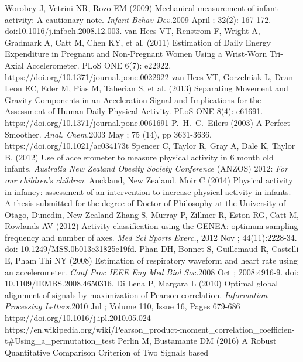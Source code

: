 \documentclass{article}
\begin{document}
\begin{thebibliography}{99} 

Worobey J, Vetrini NR, Rozo EM (2009) Mechanical measurement of infant activity: A cautionary note.
\textit{Infant Behav Dev.}2009 April ; 32(2): 167-172. doi:10.1016/j.infbeh.2008.12.003.
van Hees VT, Renstrom F, Wright A, Gradmark A, Catt M, Chen KY, et al. (2011) Estimation of Daily Energy Expenditure in Pregnant and Non-Pregnant Women Using a Wrist-Worn Tri-Axial Accelerometer. 
PLoS ONE 6(7): e22922. https://doi.org/10.1371/journal.pone.0022922
van Hees VT, Gorzelniak L, Dean Leon EC, Eder M, Pias M, Taherian S, et al. (2013) Separating Movement and Gravity Components in an Acceleration Signal and Implications for the Assessment of Human Daily Physical Activity. PLoS ONE 8(4): e61691. https://doi.org/10.1371/journal.pone.0061691
P.\ H.\ C.\ Eilers (2003) A Perfect Smoother.
\textit{Anal. Chem.}2003 May ; 75 (14), pp 3631-3636. https://doi.org/10.1021/ac034173t
Spencer C, Taylor R, Gray A, Dale K, Taylor B. (2012) Use of accelerometer to measure physical activity in
6 month old infants. \textit{Australia New Zealand Obesity Society Conference} (ANZOS) 2012: \textit{For our
children's children}. Auckland, New Zealand. 
Moir C (2014) Physical activity in infancy: assessment of an intervention to increase physical activity in infants.\\
A thesis submitted for the degree of Doctor of Philosophy at the University of Otago, Dunedin, New Zealand
Zhang S, Murray P, Zillmer R, Eston RG, Catt M, Rowlands AV (2012) Activity classification using the GENEA: optimum sampling frequency and number of axes.
\textit{Med Sci Sports Exerc.}, 2012 Nov ; 44(11):2228-34. doi: 10.1249/MSS.0b013e31825e19fd.
Phan DH, Bonnet S, Guillemaud R, Castelli E, Pham Thi NY (2008) Estimation of respiratory waveform and heart rate using an accelerometer.
\textit{Conf Proc IEEE Eng Med Biol Soc.}2008 Oct ; 2008:4916-9. doi: 10.1109/IEMBS.2008.4650316.
Di Lena P, Margara L (2010) Optimal global alignment of signals by maximization of Pearson correlation. 
\textit{Information Processing Letters}.2010 Jul ; Volume 110, Issue 16, Pages 679-686 https://doi.org/10.1016/j.ipl.2010.05.024
https://en.wikipedia.org/wiki/Pearson\_product-moment\_correlation\_coefficien-
t\#Using\_a\_permutation\_test
Perlin M, Bustamante DM (2016) A Robust Quantitative Comparison Criterion of Two Signals based 

\end{thebibliography}
\end{document}
